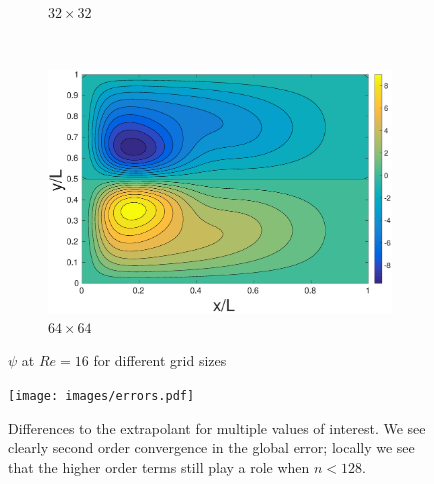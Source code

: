 \begin{figure}[h]
{\begin{subfigure}[b]{0.5\textwidth}
        \caption{$32\times 32$}
        \label{fig:nm32}
    \end{subfigure}
    ~
    \begin{subfigure}[b]{0.5\textwidth}
        \includegraphics[width=\textwidth]{images/grid64.eps}
        \caption{$64\times 64$}
        \label{fig:nm64}
    \end{subfigure}
    }
    \caption{$\psi$ at $Re = 16$ for different grid sizes}\label{fig:grids}
    
\end{figure}

\begin{figure}
	\centerline{\texttt{[image: images/errors.pdf]}}
	\caption{Differences to the extrapolant for multiple values of interest. We see clearly second order convergence in the global error; locally we see that the higher order terms still play a role when $n < 128.$}
	\label{fig:errors}
\end{figure}

